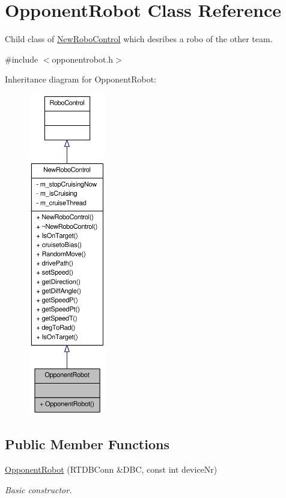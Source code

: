 \hypertarget{classOpponentRobot}{
\section{OpponentRobot Class Reference}
\label{classOpponentRobot}
}


Child class of \hyperlink{classNewRoboControl}{NewRoboControl} which desribes a robo of the other team.  




{\ttfamily \#include $<$opponentrobot.h$>$}



Inheritance diagram for OpponentRobot:\nopagebreak
\begin{figure}[H]
\begin{center}
\leavevmode
\includegraphics[height=400pt]{classOpponentRobot__inherit__graph}
\end{center}
\end{figure}
\subsection*{Public Member Functions}
\begin{DoxyCompactItemize}
\item 
\hyperlink{classOpponentRobot_a315c08a9f17d278b1bb8067929b38f83}{OpponentRobot} (RTDBConn \&DBC, const int deviceNr)
\begin{DoxyCompactList}\small\item\em Basic constructor. \item\end{DoxyCompactList}\end{DoxyCompactItemize}


